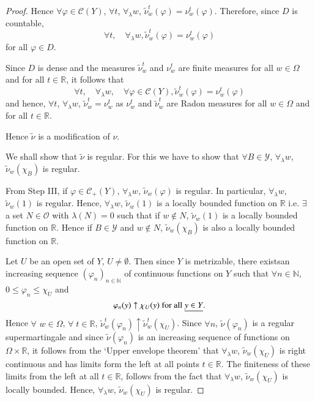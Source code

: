 \begin{proof}
Hence $\forall \varphi \in \mathscr{C}(Y) $, $\forall t$,
$\forall_\lambda w$, $\tilde{\nu}^t_w(\varphi) =
\nu^t_w(\varphi)$. Therefore, since $D$ is countable, 
$$
\forall t, \quad \forall_\lambda w, \tilde{\nu}^t_w (\varphi) = \nu^t_w(\varphi)
$$
for all $\varphi \in D$. 

Since $D$ is dense and the measures $\tilde{\nu}^t_w$ and $\nu^t_w$
are finite measures for all $w \in\Omega$ and for all $t \in
\mathbb{R}$, it follows that 
$$
\forall t, \quad \forall_\lambda w, \quad \forall \varphi \in
\mathscr{C} (Y) , \tilde{\nu}^t_w(\varphi) = \nu^t_w(\varphi)
$$
and hence, $\forall t$, $\forall_\lambda w$, $\tilde{\nu}^t_w =
\nu^t_w$ as $\nu^t_w$ and $\tilde{\nu}^t_w$ are Radon measures for all
$w \in \Omega$ and for all $t \in\mathbb{R}$. 

Hence $\tilde{\nu}$ is a modification of $\nu$.

\medskip
{}

We shall show that $\tilde{\nu}$ is regular. For this we have to show
that $\forall B \in \mathscr{Y}$, $\forall_\lambda w$,
$\tilde{\nu}_w(\chi_B)$ is regular.

From Step III, if $\varphi \in \mathscr{C}_+(Y)$, $\forall_\lambda w$,
$\tilde{\nu}_w(\varphi)$ is regular. In particular, $\forall_\lambda
w$, $\tilde{\nu}_w(1)$ is regular. Hence, $\forall_\lambda w$,
$\tilde{\nu}_w(1)$ is a locally bounded function on $\mathbb{R}$
i.e. $\exists$  a set $N \in\mathscr{O}$  with $\lambda(N) =0$ such
that if $w \not\in N$, $\tilde{\nu}_w(1)$ is a locally bounded
function on $\mathbb{R}$. Hence if $B \in \mathscr{Y}$ and $w \not\in
N$, $\tilde{\nu}_w(\chi_B)$ is also a locally bounded function on
$\mathbb{R}$.

Let $U$ be an open set of $Y$, $U \neq \emptyset$. Then since $Y$ is
metrizable, there exists\pageoriginale an increasing sequence
$(\varphi_n)_{n \in \mathbb{N}}$ of continuous functions on $Y$ such
that $\forall n \in \mathbb{N}$, $0 \leq \varphi_n \leq \chi_U$ and 
$$
\varphi_n (y) \uparrow \chi_U(y) \text{ for all } \underline{y \in Y}. 
$$
Hence $\forall$ $w \in \Omega$, $\forall \; t \in \mathbb{R}$,
$\tilde{\nu}^t_w (\varphi_n) \uparrow \tilde{\nu}^t_w(\chi_U)$. Since
$\forall n$, $\tilde{\nu}(\varphi_n)$ is a regular supermartingale and
since $\tilde{\nu}(\varphi_n)$ is an increasing sequence of functions
on $\Omega \times \mathbb{R}$, it follows from the `Upper envelope
theorem' that $\forall_\lambda w$, $\tilde{\nu}_w(\chi_U)$ is right
continuous and has limits form the left at all points $t \in
\mathbb{R}$. The finiteness of these limits from the left at all $t
\in \mathbb{R}$, follows from the fact that $\forall_\lambda w$,
$\tilde{\nu}_w (\chi_U)$ is locally bounded. Hence, $\forall_\lambda
w$, $\tilde{\nu}_w(\chi_U)$ is regular. 


\end{proof}

